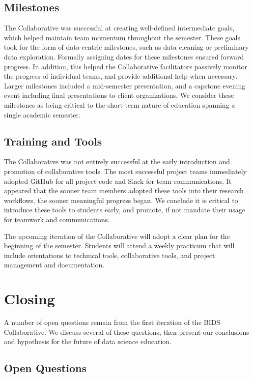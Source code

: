 \documentclass[12pt]{article}
\begin{document}
\subsection{Milestones}

The Collaborative was successful at creating well-defined intermediate goals, which helped maintain team momentum throughout the semester.  These goals took for the form of data-centric milestones, such as data cleaning or preliminary data exploration.  Formally assigning dates for these milestones ensured forward progress.  In addition, this helped the Collaborative facilitators passively monitor the progress of individual teams, and provide additional help when necessary.  Larger milestones included a mid-semester presentation, and a capstone evening event including final presentations to client organizations.  We consider these milestones as being critical to the short-term nature of education spanning a single academic semester.

\subsection{Training and Tools}

The Collaborative was not entirely successful at the early introduction and promotion of collaborative tools.  The most successful project teams immediately adopted GitHub for all project code and Slack for team communications.  It appeared that the sooner team members adopted these tools into their research workflows, the sooner meaningful progress began.  We conclude it is critical to introduce these tools to students early, and promote, if not mandate their usage for teamwork and communications.

The upcoming iteration of the Collaborative will adopt a clear plan for the beginning of the semester. Students will attend a weekly practicum that will include orientations to technical tools, collaborative tools, and project management and documentation.



\section{Closing}

A number of open questions remain from the first iteration of the BIDS Collaborative.  We discuss several of these questions, then present our conclusions and hypothesis for the future of data science education.

\subsection{Open Questions}
\end{document}
